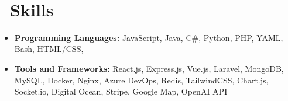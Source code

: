 \documentclass{resume}
\begin{document}


   \textperiodcentered\

  \section{\faCogs\ Skills}
  \begin{itemize}[parsep=0.5ex]
    \item \textbf{Programming Languages:} JavaScript, Java, C#, Python, PHP, YAML, Bash, HTML/CSS,
    \item \textbf{Tools and Frameworks:} React.js, Express.js, Vue.js, Laravel, MongoDB, MySQL, Docker, Nginx, Azure DevOps, Redis, TailwindCSS, Chart.js, Socket.io, Digital Ocean, Stripe, Google Map, OpenAI API
  \end{itemize}
  
  
\end{document}
